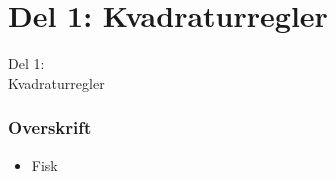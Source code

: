 \section{Del 1: Kvadraturregler}
\begin{frame}
\centering
\Huge
Del 1: \\
Kvadraturregler
\end{frame}
%
\begin{frame}
\frametitle{Overskrift}
\begin{itemize}
\item Fisk
\end{itemize}
\end{frame}



